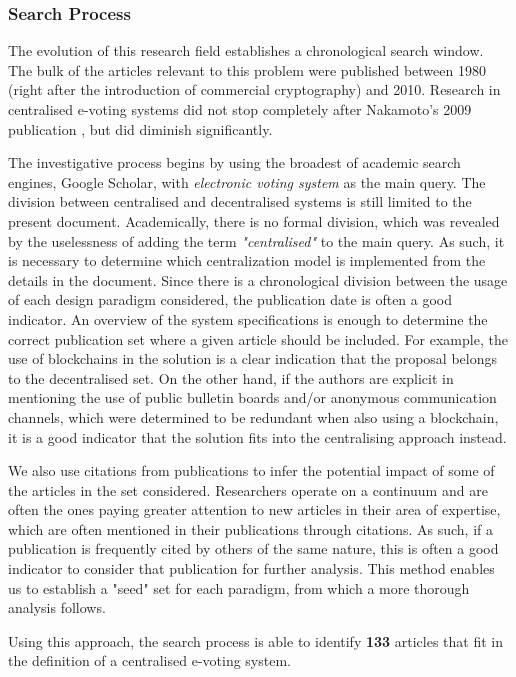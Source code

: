 \documentclass[../access.tex]{subfiles}
\begin{document}
    \subsubsection{Search Process}
    \label{centralized-search}
    The evolution of this research field establishes a chronological search window. The bulk of the articles relevant to this problem were published between 1980 (right after the introduction of commercial cryptography) and 2010. Research in centralised e-voting systems did not stop completely after Nakamoto's 2009 publication \cite{Nakamoto2008}, but did diminish significantly.
    \par
    The investigative process begins by using the broadest of academic search engines, Google Scholar, with \textit{electronic voting system} as the main query. The division between centralised and decentralised systems is still limited to the present document. Academically, there is no formal division, which was revealed by the uselessness of adding the term \textit{"centralised"} to the main query. As such, it is necessary to determine which centralization model is implemented from the details in the document. Since there is a chronological division between the usage of each design paradigm considered, the publication date is often a good indicator. An overview of the system specifications is enough to determine the correct publication set where a given article should be included. For example, the use of blockchains in the solution is a clear indication that the proposal belongs to the decentralised set. On the other hand, if the authors are explicit in mentioning the use of public bulletin boards and/or anonymous communication channels, which were determined to be redundant when also using a blockchain, it is a good indicator that the solution fits into the centralising approach instead.
    \par
    We also use citations from publications to infer the potential impact of some of the articles in the set considered. Researchers operate on a continuum and are often the ones paying greater attention to new articles in their area of expertise, which are often mentioned in their publications through citations. As such, if a publication is frequently cited by others of the same nature, this is often a good indicator to consider that publication for further analysis. This method enables us to establish a "seed" set for each paradigm, from which a more thorough analysis follows.
    \par
    Using this approach, the search process is able to identify \textbf{133} articles that fit in the definition of a centralised e-voting system.
    
\end{document}

